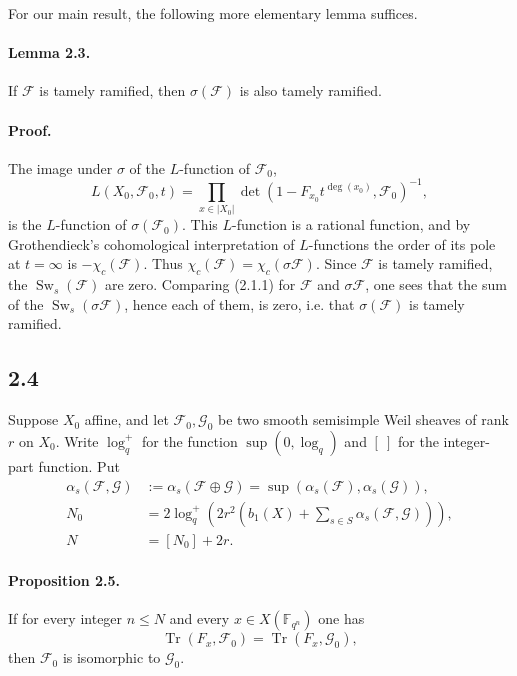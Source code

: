 \documentclass[11pt]{article}
\newcommand{\F}{\mathbb{F}}
\newcommand{\Tr}{\operatorname{Tr}}
\newcommand{\Sw}{\operatorname{Sw}}
\begin{document}
For our main result, the following more elementary lemma suffices.

\paragraph{Lemma 2.3.}
If $\mathcal F$ is tamely ramified, then $\sigma(\mathcal F)$ is also tamely ramified.

\paragraph{Proof.}
The image under $\sigma$ of the $L$-function of $\mathcal F_0$,
\[
 L(X_0,\mathcal F_0,t)=\prod_{x\in |X_0|}\det\left(1-F_{x_0}t^{\deg(x_0)},\mathcal F_0\right)^{-1},
\]
is the $L$-function of $\sigma(\mathcal F_0)$.
This $L$-function is a rational function, and by Grothendieck's cohomological interpretation of $L$-functions the order of its pole at $t=\infty$ is $-\chi_c(\mathcal F)$.
Thus $\chi_c(\mathcal F)=\chi_c(\sigma\mathcal F)$.
Since $\mathcal F$ is tamely ramified, the $\Sw_s(\mathcal F)$ are zero.
Comparing (2.1.1) for $\mathcal F$ and $\sigma\mathcal F$, one sees that the sum of the $\Sw_s(\sigma\mathcal F)$, hence each of them, is zero, i.e. that $\sigma(\mathcal F)$ is tamely ramified.

\subsection*{2.4}
Suppose $X_0$ affine, and let $\mathcal F_0,\mathcal G_0$ be two smooth semisimple Weil sheaves of rank $r$ on $X_0$.
Write $\log_q^+$ for the function $\sup(0,\log_q)$ and $[\ ]$ for the integer-part function.
Put
\begin{align}
 \alpha_s(\mathcal F,\mathcal G)&:=\alpha_s(\mathcal F\oplus\mathcal G)=\sup(\alpha_s(\mathcal F),\alpha_s(\mathcal G)),\tag{2.4.1}\\
 N_0&=2\log_q^+\left(2r^2\left(b_1(X)+\sum_{s\in S}\alpha_s(\mathcal F,\mathcal G)\right)\right),\tag{2.4.2}\\
 N&=[N_0]+2r.\tag{2.4.3}
\end{align}

\paragraph{Proposition 2.5.}
If for every integer $n\le N$ and every $x\in X(\F_{q^n})$ one has
\[
 \Tr(F_x,\mathcal F_0)=\Tr(F_x,\mathcal G_0),
\]
then $\mathcal F_0$ is isomorphic to $\mathcal G_0$.
\end{document}
